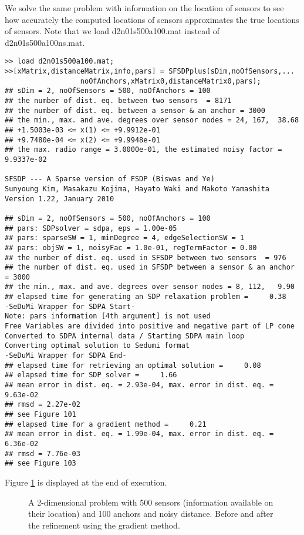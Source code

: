 \documentclass[12pt]{article}
\begin{document}
We solve the same problem with information on the location of sensors to see how accurately 
the computed locations of sensors approximates the true locations of
sensors. 
Note that we load d2n01s500a100.mat instead of
d2n01s500a100ns.mat. 
\begin{verbatim}
>> load d2n01s500a100.mat;
>>[xMatrix,distanceMatrix,info,pars] = SFSDPplus(sDim,noOfSensors,...
                  noOfAnchors,xMatrix0,distanceMatrix0,pars);
## sDim = 2, noOfSensors = 500, noOfAnchors = 100
## the number of dist. eq. between two sensors  = 8171
## the number of dist. eq. between a sensor & an anchor = 3000
## the min., max. and ave. degrees over sensor nodes = 24, 167,  38.68
## +1.5003e-03 <= x(1) <= +9.9912e-01
## +9.7480e-04 <= x(2) <= +9.9948e-01
## the max. radio range = 3.0000e-01, the estimated noisy factor = 9.9337e-02

SFSDP --- A Sparse version of FSDP (Biswas and Ye)
Sunyoung Kim, Masakazu Kojima, Hayato Waki and Makoto Yamashita
Version 1.22, January 2010

## sDim = 2, noOfSensors = 500, noOfAnchors = 100
## pars: SDPsolver = sdpa, eps = 1.00e-05
## pars: sparseSW = 1, minDegree = 4, edgeSelectionSW = 1
## pars: objSW = 1, noisyFac = 1.0e-01, regTermFactor = 0.00
## the number of dist. eq. used in SFSDP between two sensors  = 976
## the number of dist. eq. used in SFSDP between a sensor & an anchor = 3000
## the min., max. and ave. degrees over sensor nodes = 8, 112,   9.90
## elapsed time for generating an SDP relaxation problem =     0.38
-SeDuMi Wrapper for SDPA Start-
Note: pars information [4th argument] is not used
Free Variables are divided into positive and negative part of LP cone
Converted to SDPA internal data / Starting SDPA main loop
Converting optimal solution to Sedumi format
-SeDuMi Wrapper for SDPA End-
## elapsed time for retrieving an optimal solution =     0.08
## elapsed time for SDP solver =     1.66
## mean error in dist. eq. = 2.93e-04, max. error in dist. eq. = 9.63e-02
## rmsd = 2.27e-02
## see Figure 101
## elapsed time for a gradient method =     0.21
## mean error in dist. eq. = 1.99e-04, max. error in dist. eq. = 6.36e-02
## rmsd = 7.76e-03
## see Figure 103
\end{verbatim}

Figure \ref{EG1} is displayed at the end of execution.
\begin{figure}
  \hspace{1mm}
\caption{A 2-dimensional problem with 500 sensors  (information available on their location) 
and 100 anchors and noisy distance. 
Before and after the refinement using the gradient method.}
\label{EG1}
\end{figure}
\end{document}
